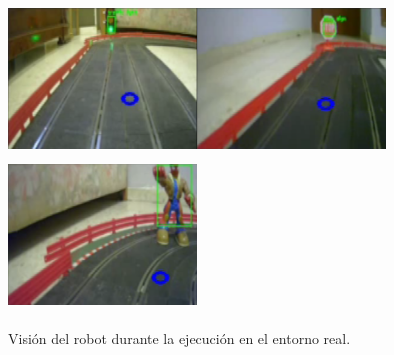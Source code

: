 \begin{figure} [h!]
	\begin{center}
		\includegraphics[width=5cm, height=4cm]{figs/screenshottrafficlight}\hspace{0.1cm}\includegraphics[width=5cm, height=4cm]{figs/screenshotstopsign}\hspace{0.1cm}\includegraphics[width=5cm, height=4cm]{figs/screenshotpedestrian}
	\end{center}
	\caption{Visión del robot durante la ejecución en el entorno real.}
	\label{fig:screenshotsreal}
\end{figure}\

